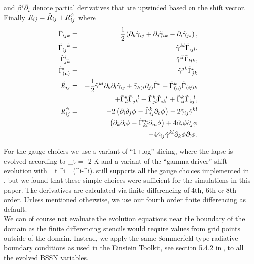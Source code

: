 \documentclass[useAMS,usenatbib]{iopart}
\begin{document}
and $\upwindu{}{}{i}$ denote partial derivatives that are upwinded based on the
shift vector. Finally $R_{ij} = \tlR_{ij} + R^{\phi}_{ij}$ where
\begin{eqnarray}
  \tlG_{ijk} & = & \frac{1}{2}\left ( \pdl{\tlg}{ij}{k} + \pdl{\tlg}{ik}{j} 
               - \pdl{\tlg}{jk}{i} \right ), \\
  \tlGmixed{ij}{k} & = & \tlg^{kl} \tlG_{ijl}, \\
  \tlG^{i}_{jk} & = & \tlg^{il}\tlG_{ljk}, \\
  \tlGn^{i} & = & \tlg^{jk} \tlG^{i}_{jk} \\
  \tlR_{ij} & = & -\frac{1}{2} \tlg^{kl} \pdpdl{\tlg}{ij}{k}{l}
                  +\tlg_{k(i} \pdu{\tlG}{k}{j)}
                  +\tlGn^{k} \tlG_{(ij)k} \nonumber \\
            &   & +\tlG^{k}_{il} \tlGmixed{jk}{l}
                  +\tlG^{k}_{jl} \tlGmixed{ik}{l}
                  +\tlG^{k}_{il} \tlGmixed{kj}{l}, \\
  R^{\phi}_{ij} & = & -2\left (\pdpdu{\phi}{}{i}{j}
                 -\tlG^{k}_{ij}\pdu{\phi}{}{k}\right )
                 -2\tlg_{ij} \tlg^{kl} \nonumber\\
            & &     \left ( \pdpdu{\phi}{}{k}{l}
                 -\tlG^{m}_{kl}\pdu{\phi}{}{m}\right ) 
                + 4\pdu{\phi}{}{i}\pdu{\phi}{}{j} \nonumber\\
             & &    - 4\tlg_{ij}\tlg^{kl}\pdu{\phi}{}{k}\pdu{\phi}{}{l}.
\end{eqnarray}

For the gauge choices we use a variant of ``1+log''-slicing, where the lapse
is evolved according
to
\be
\partial_t \alpha= -2 \alpha K
\ee
and a variant of the ``gamma-driver'' shift evolution with
\be
\partial_t \beta^i= (\tilde{\Gamma}^i-\beta^i).
\ee
\SpB still supports all the gauge choices implemented in \mcl, but we found
that these simple choices were sufficient for the simulations in this paper.
The derivatives are calculated via finite differencing of 4th, 6th or 8th
order. Unless mentioned otherwise, we use our fourth order finite
differencing as default.\\
We can of course not evaluate the evolution equations near the boundary
of the domain as the finite differencing stencils would require values from
grid points outside of the domain. Instead, we apply the same Sommerfeld-type
radiative boundary conditions as used in the Einstein Toolkit, see 
section 5.4.2 in \cite{Loffler:2011ay}, to all the evolved BSSN variables.
\end{document}
